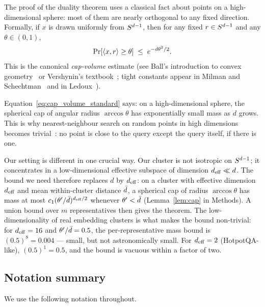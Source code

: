 The proof of the duality theorem uses a classical fact about points on a
high-dimensional sphere: most of them are nearly orthogonal to any fixed
direction. Formally, if $x$ is drawn uniformly from $S^{d-1}$, then for
any fixed $r \in S^{d-1}$ and any $\theta \in (0, 1)$,
\begin{equation}
\Pr[\left\langle x,r\right\rangle \geq \theta] \;\leq\; e^{-d \theta^2 / 2}.
\label{eq:cap_volume_standard}
\end{equation}
This is the canonical \emph{cap-volume} estimate (see Ball's
introduction to convex geometry~\cite{ball1997elementary} or Vershynin's
textbook~\cite{vershynin2018hdp}; tight constants appear in Milman and
Schechtman~\cite{milman1986asymptotic} and in
Ledoux~\cite{ledoux2001concentration}).

Equation~\eqref{eq:cap_volume_standard} says: on a high-dimensional
sphere, the spherical cap of angular radius $\arccos\theta$ has
exponentially small mass as $d$ grows. This is why nearest-neighbour
search on random points in high dimensions becomes
trivial~\cite{beyer1999nn}: no point is close to the query except the
query itself, if there is one.

Our setting is different in one crucial way. Our cluster is not isotropic
on $S^{d-1}$; it concentrates in a low-dimensional effective subspace of
dimension ${d_{\mathrm{eff}}} \ll d$. The bound we need therefore replaces $d$ by
${d_{\mathrm{eff}}}$: on a cluster with effective dimension ${d_{\mathrm{eff}}}$ and mean
within-cluster distance $\bar{d}$, a spherical cap of radius
$\arccos\theta$ has mass at most $c_1 (\theta'/\bar{d})^{{d_{\mathrm{eff}}}/2}$
whenever $\theta' < \bar{d}$ (Lemma~\ref{lem:cap} in Methods). A union
bound over $m$ representatives then gives the theorem. The
low-dimensionality of real embedding clusters is what makes the bound
non-trivial: for ${d_{\mathrm{eff}}} = 16$ and $\theta' / \bar{d} = 0.5$, the
per-representative mass bound is $(0.5)^{8} = 0.004$ --- small, but not
astronomically small. For ${d_{\mathrm{eff}}} = 2$ (HotpotQA-like), $(0.5)^1 = 0.5$,
and the bound is vacuous within a factor of two.

\subsection{Notation summary}
\label{sec:background:notation}

We use the following notation throughout.


